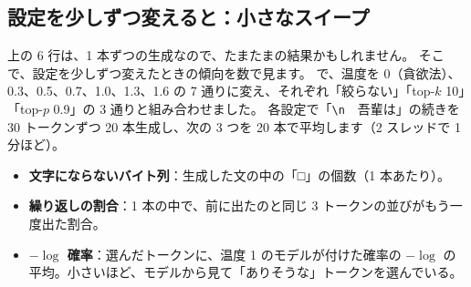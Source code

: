 \subsection*{設定を少しずつ変えると：小さなスイープ}

上の 6 行は、1 本ずつの生成なので、たまたまの結果かもしれません。
そこで、設定を少しずつ変えたときの傾向を数で見ます。
 で、温度を 0（貪欲法）、0.3、0.5、0.7、1.0、1.3、1.6 の 7 通りに変え、それぞれ「絞らない」「top-$k$ 10」「top-$p$ 0.9」の 3 通りと組み合わせました。
各設定で「\texttt{\textbackslash n}　吾輩は」の続きを 30 トークンずつ 20 本生成し、次の 3 つを 20 本で平均します（2 スレッドで 1 分ほど）。
\begin{itemize}
\item \textbf{文字にならないバイト列}：生成した文の中の「□」の個数（1 本あたり）。
\item \textbf{繰り返しの割合}：1 本の中で、前に出たのと同じ 3 トークンの並びがもう一度出た割合。
\item \textbf{$-\log$ 確率}：選んだトークンに、温度 1 のモデルが付けた確率の $-\log$ の平均。小さいほど、モデルから見て「ありそうな」トークンを選んでいる。
\end{itemize}


